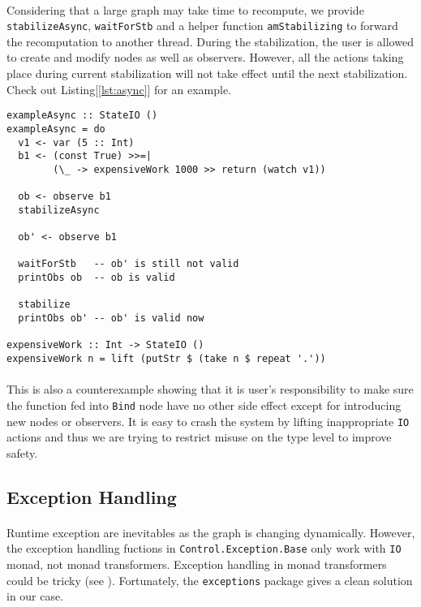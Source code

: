 \documentclass[a4paper, twocolumn]{article}
\newcommand{\code}{\texttt} %
\begin{document}
\paragraph{} Considering that a large graph may take time to recompute, we provide \code{stabilizeAsync}, \code{waitForStb} and a helper function \code{amStabilizing} to forward the recomputation to another thread. During the stabilization, the user is allowed to create and modify nodes as well as observers. However, all the actions taking place during current stabilization will not take effect until the next stabilization. Check out Listing[\ref{lst:async}] for an example.
\begin{lstlisting}[caption=Asynchrnous Stabilization, label={lst:async}]
exampleAsync :: StateIO ()
exampleAsync = do
  v1 <- var (5 :: Int)
  b1 <- (const True) >>=| 
        (\_ -> expensiveWork 1000 >> return (watch v1))

  ob <- observe b1
  stabilizeAsync
  
  ob' <- observe b1

  waitForStb   -- ob' is still not valid
  printObs ob  -- ob is valid
  
  stabilize
  printObs ob' -- ob' is valid now

expensiveWork :: Int -> StateIO ()
expensiveWork n = lift (putStr $ (take n $ repeat '.'))
\end{lstlisting}

\paragraph{} This is also a counterexample showing that it is user's responsibility to make sure the function fed into \code{Bind} node have no other side effect except for introducing new nodes or observers. It is easy to crash the system by lifting inappropriate \code{IO} actions and thus we are trying to restrict misuse on the type level to improve safety.

\subsection{Exception Handling}
\paragraph{} Runtime exception are inevitables as the graph is changing dynamically. However, the exception handling fuctions in \code{Control.Exception.Base} only work with \code{IO} monad, not monad transformers. Exception handling in monad transformers could be tricky (see \cite{exception}). Fortunately, the \code{exceptions} package gives a clean solution in our case.
\end{document}
